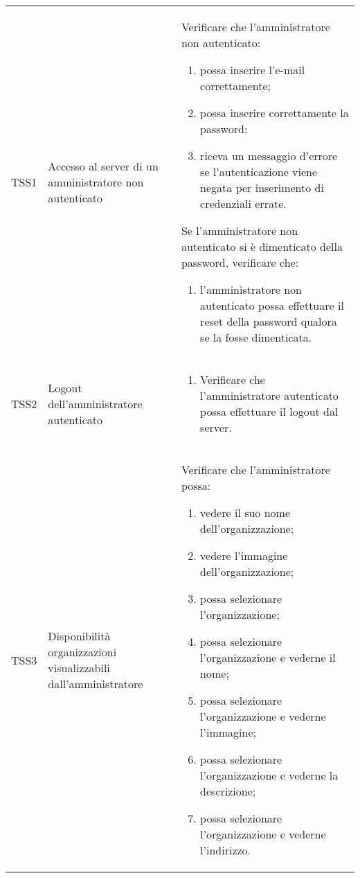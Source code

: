 {\begin{longtable}{ c | C{3cm} | C{11cm} }
TSS1 & Accesso al server di un amministratore non autenticato & 
Verificare che l'amministratore non autenticato:
\begin{enumerate}
    \item possa inserire l'e-mail correttamente;
    \item possa inserire correttamente la password;
    \item riceva un messaggio d'errore se l'autenticazione viene negata per inserimento di credenziali errate.
\end{enumerate}
Se l'amministratore non autenticato si è dimenticato della password, verificare che:
\begin{enumerate}
    \item l'amministratore non autenticato possa effettuare il reset della password qualora se la fosse dimenticata.
\end{enumerate} \\

TSS2 & Logout dell'amministratore autenticato & \begin{enumerate}
    \item Verificare che l'amministratore autenticato possa effettuare il logout dal server.
\end{enumerate} \\

TSS3 & Disponibilità organizzazioni visualizzabili dall'amministratore &
Verificare che l'amministratore possa:
\begin{enumerate}
    \item vedere il suo nome dell'organizzazione;
    \item vedere l'immagine dell'organizzazione;
    \item possa selezionare l'organizzazione;
    \item possa selezionare l'organizzazione e vederne il nome;
    \item possa selezionare l'organizzazione e vederne l'immagine;
    \item possa selezionare l'organizzazione e vederne la descrizione;
    \item possa selezionare l'organizzazione e vederne l'indirizzo.
\end{enumerate} \\


\end{longtable}}
